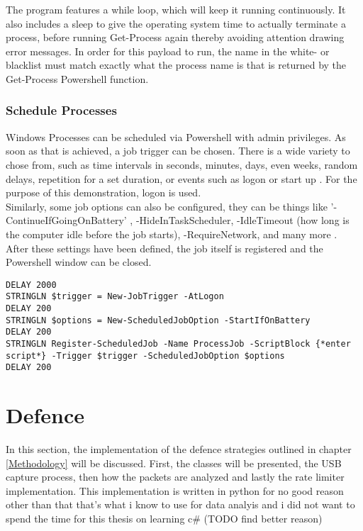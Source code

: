 The program features a while loop, which will keep it running continuously. It also includes a sleep to give the operating system time to actually terminate a process, before running Get-Process again thereby avoiding attention drawing error messages. In order for this payload to run, the name in the white- or blacklist must match exactly what the process name is that is returned by the Get-Process Powershell function. 



\subsubsection{Schedule Processes}

Windows Processes can be scheduled via Powershell with admin privileges. As soon as that is achieved, a job trigger can be chosen. There is a wide variety to chose from, such as time intervals in seconds, minutes, days, even weeks, random delays, repetition for a set duration, or events such as logon or start up \cite{sdwheelerNewJobTriggerPSScheduledJobPowerShell}.
For the purpose of this demonstration, logon is used. \\
Similarly, some job options can also be configured, they can be things like '-ContinueIfGoingOnBattery' , -HideInTaskScheduler, -IdleTimeout (how long is the computer idle before the job starts), -RequireNetwork, and many more \cite{sdwheelerSetScheduledJobOptionPSScheduledJobPowerShell}. \\
After these settings have been defined, the job itself is registered and the Powershell window can be closed. \\


\begin{lstlisting}[caption={Excerpt: register a scheduled job via Powershell}, captionpos=b]
DELAY 2000
STRINGLN $trigger = New-JobTrigger -AtLogon
DELAY 200
STRINGLN $options = New-ScheduledJobOption -StartIfOnBattery
DELAY 200
STRINGLN Register-ScheduledJob -Name ProcessJob -ScriptBlock {*enter script*} -Trigger $trigger -ScheduledJobOption $options
DELAY 200
\end{lstlisting}


\section{Defence}

In this section, the implementation of the defence strategies outlined in chapter \ref{Methodology} will be discussed. First, the classes will be presented, the USB capture process, then how the packets are analyzed and lastly the rate limiter implementation. 
This implementation is written in python for no good reason other than that that's what i know to use for data analyis and i did not want to spend the time for this thesis on learning c\# (TODO find better reason)

